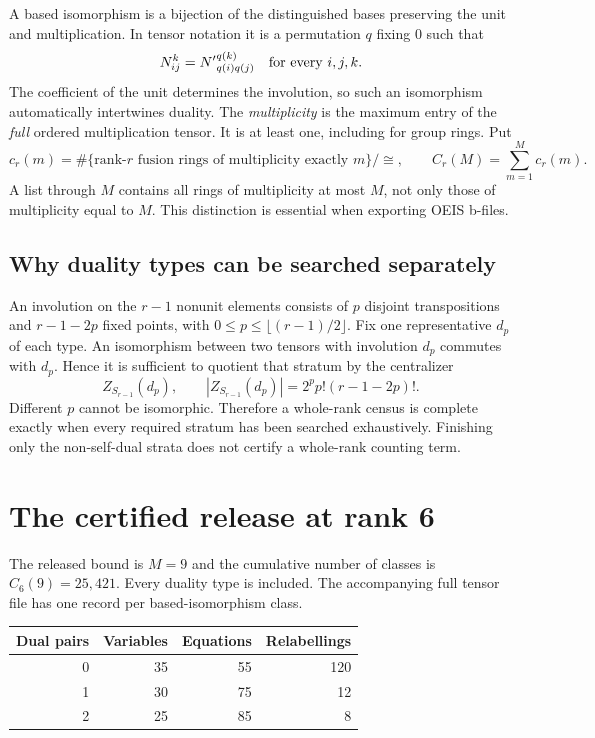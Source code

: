 \documentclass[11pt,a4paper]{article}
\theoremstyle{definition}\newtheorem{definition}[theorem]{Definition}\newtheorem{remark}[theorem]{Remark}
\begin{document}
A based isomorphism is a bijection of the distinguished bases preserving the
unit and multiplication. In tensor notation it is a permutation $q$ fixing $0$
such that
\[
 N_{ij}^{k}={N'}_{q(i)q(j)}^{q(k)}\quad\hbox{for every }i,j,k.
\]
The coefficient of the unit determines the involution, so such an isomorphism
automatically intertwines duality. The \emph{multiplicity} is the maximum entry
of the \emph{full} ordered multiplication tensor. It is at least one, including
for group rings. Put
\[
 c_r(m)=\#\{\text{rank-}r\text{ fusion rings of multiplicity exactly }m\}/\cong,
 \qquad C_r(M)=\sum_{m=1}^{M}c_r(m).
\]
A list through $M$ contains all rings of multiplicity at most $M$, not only
those of multiplicity equal to $M$. This distinction is essential when exporting
OEIS b-files.

\subsection{Why duality types can be searched separately}
An involution on the $r-1$ nonunit elements consists of $p$ disjoint transpositions
and $r-1-2p$ fixed points, with $0\leq p\leq\lfloor(r-1)/2\rfloor$. Fix one
representative $d_p$ of each type. An isomorphism between two tensors with
involution $d_p$ commutes with $d_p$. Hence it is sufficient to quotient that
stratum by the centralizer
\[
 Z_{S_{r-1}}(d_p),\qquad |Z_{S_{r-1}}(d_p)|=2^p p!(r-1-2p)!.
\]
Different $p$ cannot be isomorphic. Therefore a whole-rank census is complete
exactly when every required stratum has been searched exhaustively. Finishing
only the non-self-dual strata does not certify a whole-rank counting term.
\section{The certified release at rank 6}
The released bound is $M=9$ and the cumulative number of classes is $C_{6}(9)=25,421$. Every duality type is included. The accompanying full tensor file has one record per based-isomorphism class.

\begin{center}\begin{tabular}{rrrr}\toprule Dual pairs & Variables & Equations & Relabellings\\\midrule
0 & 35 & 55 & 120\\
1 & 30 & 75 & 12\\
2 & 25 & 85 & 8\\
\bottomrule\end{tabular}\end{center}
\end{document}
